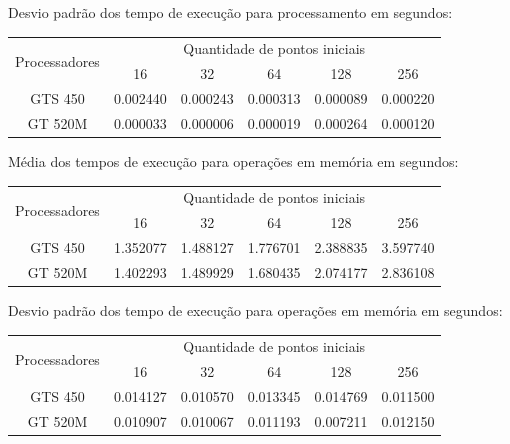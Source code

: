     \hspace{1mm}\newline
    
    \noindent Desvio padrão dos tempo de execução para processamento em segundos:\\
    \begin{tabular}{| c | c | c | c | c | c |}
      \hline
      \multirow{2}{*}{Processadores}& \multicolumn{5}{|c|}{Quantidade de pontos iniciais} \\ \cline{2-6}
      & 16 & 32 & 64 & 128 & 256 \\ \hline
      GTS 450 & 0.002440 & 0.000243 & 0.000313 & 0.000089 & 0.000220 \\ \hline
      GT 520M & 0.000033 & 0.000006 & 0.000019 & 0.000264 & 0.000120 \\ \hline

      \hline
    \end{tabular}
    
    \hspace{1mm}\newline
    
    \noindent Média dos tempos de execução para operações em memória em segundos:\\
    \begin{tabular}{| c | c | c | c | c | c |}
      \hline
      \multirow{2}{*}{Processadores}& \multicolumn{5}{|c|}{Quantidade de pontos iniciais} \\ \cline{2-6}
      & 16 & 32 & 64 & 128 & 256 \\ \hline
      GTS 450 & 1.352077 & 1.488127 & 1.776701 & 2.388835 & 3.597740 \\ \hline
      GT 520M & 1.402293 & 1.489929 & 1.680435 & 2.074177 & 2.836108\\ \hline

      \hline
    \end{tabular}
    
    \hspace{1mm}\newline
    
    \noindent Desvio padrão dos tempo de execução para operações em memória em segundos:\\
    \begin{tabular}{| c | c | c | c | c | c |}
      \hline
      \multirow{2}{*}{Processadores}& \multicolumn{5}{|c|}{Quantidade de pontos iniciais} \\ \cline{2-6}
      & 16 & 32 & 64 & 128 & 256 \\ \hline
      GTS 450 & 0.014127 & 0.010570 & 0.013345 & 0.014769 & 0.011500 \\ \hline
      GT 520M & 0.010907 & 0.010067 & 0.011193 & 0.007211 & 0.012150 \\ \hline

      \hline
    \end{tabular}
    
